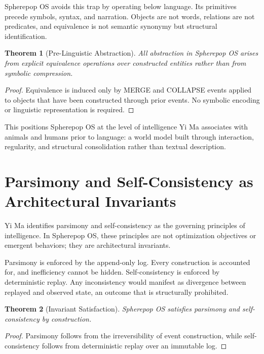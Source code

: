 \documentclass[11pt]{article}
\newtheorem{theorem}{Theorem}[section]
\begin{document}
Spherepop OS avoids this trap by operating below language. Its primitives
precede symbols, syntax, and narration. Objects are not words, relations are
not predicates, and equivalence is not semantic synonymy but structural
identification.

\begin{theorem}[Pre-Linguistic Abstraction]
All abstraction in Spherepop OS arises from explicit equivalence operations
over constructed entities rather than from symbolic compression.
\end{theorem}

\begin{proof}
Equivalence is induced only by MERGE and COLLAPSE events applied to objects
that have been constructed through prior events. No symbolic encoding or
linguistic representation is required.
\end{proof}

This positions Spherepop OS at the level of intelligence Yi Ma associates
with animals and humans prior to language: a world model built through
interaction, regularity, and structural consolidation rather than textual
description.

\section{Parsimony and Self-Consistency as Architectural Invariants}

Yi Ma identifies parsimony and self-consistency as the governing principles
of intelligence. In Spherepop OS, these principles are not optimization
objectives or emergent behaviors; they are architectural invariants.

Parsimony is enforced by the append-only log. Every construction is
accounted for, and inefficiency cannot be hidden. Self-consistency is
enforced by deterministic replay. Any inconsistency would manifest as
divergence between replayed and observed state, an outcome that is
structurally prohibited.

\begin{theorem}[Invariant Satisfaction]
Spherepop OS satisfies parsimony and self-consistency by construction.
\end{theorem}

\begin{proof}
Parsimony follows from the irreversibility of event construction, while
self-consistency follows from deterministic replay over an immutable log.
\end{proof}
\end{document}
